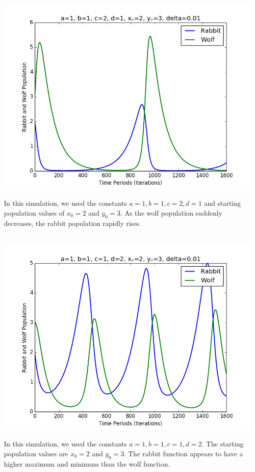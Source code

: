 \documentclass{article}
\begin{document}
\\
\centerline{\includegraphics[scale=0.5]{exercise5/figure_1-4.png}}
In this simulation, we used the constants $a=1, b=1, c=2, d=1$ and starting population values of $x_0=2$ and $y_0=3$.
As the wolf population suddenly decreases, the rabbit population rapidly rises.\\
\\
\centerline{\includegraphics[scale=0.5]{exercise5/figure_1-5.png}}
In this simulation, we used the constants $a=1, b=1, c=1, d=2$.
The starting population values are $x_0=2$ and $y_0=3$.
The rabbit function appears to have a higher maximum and minimum than the wolf function.\\
\end{document}
